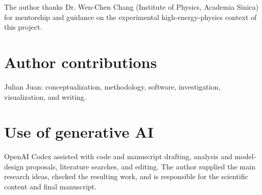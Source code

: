 \documentclass[11pt]{article}
\begin{document}
The author thanks Dr. Wen-Chen Chang (Institute of Physics, Academia Sinica) for mentorship and guidance on the experimental high-energy-physics context of this project.

\section*{Author contributions}

Julian Juan: conceptualization, methodology, software, investigation, visualization, and writing.

\section*{Use of generative AI}

OpenAI Codex assisted with code and manuscript drafting, analysis and model-design proposals, literature searches, and editing. The author supplied the main research ideas, checked the resulting work, and is responsible for the scientific content and final manuscript.

\printbibliography
\end{document}
